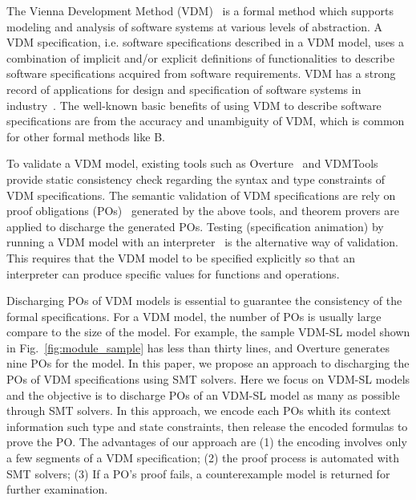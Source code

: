 The Vienna Development Method (VDM)~\cite{Jones:1990:SSD:94062,Fitzgerald:2005:VDO:1044891,Fitz:PGLarson:2009book} is a formal method which supports modeling and analysis of software systems at various levels of abstraction. A VDM specification, i.e. software specifications described in a VDM model, uses a combination of implicit and/or explicit definitions of functionalities to describe software specifications acquired from software requirements. VDM has a strong record of applications for design and specification of software systems in industry~\cite{Larsen:2007:RIA:2227886.2227894,DBLP:conf/fm/KuritaCN08,DBLP:journals/ijsi/KuritaN09}. The well-known basic benefits of using VDM to describe software specifications are from the accuracy and unambiguity of VDM, which is common for other formal methods like B. 

To validate a VDM model, existing tools such as Overture~\cite{Larsen:2010:OII:1668862.1668864} and VDMTools provide static consistency check regarding the syntax and type constraints of VDM specifications. The semantic validation of VDM specifications are rely on proof obligations (POs)~\cite{AL:97:POGV} generated by the above tools, and theorem provers are applied to discharge the generated POs. Testing (specification animation) by running a VDM model with an interpreter~\cite{Prehn:1991:LNCS551} is the alternative way of validation. This requires that the VDM model to be specified explicitly so that an interpreter can produce specific values for functions and operations.

Discharging POs of VDM models is essential to guarantee the consistency of the formal specifications. For a VDM model, the number of POs is usually large compare to the size of the model. For example, the sample VDM-SL model shown in Fig.~\ref{fig:module_sample} has less than thirty lines, and Overture generates nine POs for the model. In this paper, we propose an approach to discharging the POs of VDM specifications using SMT solvers. Here we focus on VDM-SL models and the objective is to discharge POs of an VDM-SL model as many as possible through SMT solvers. In this approach, we encode each POs whith its context information such type and state constraints, then release the encoded formulas to prove the PO. The advantages of our approach are (1) the encoding involves only a few segments of a VDM specification; (2) the proof process is automated with SMT solvers; (3) If a PO's proof fails, a counterexample model is returned for further examination. 


